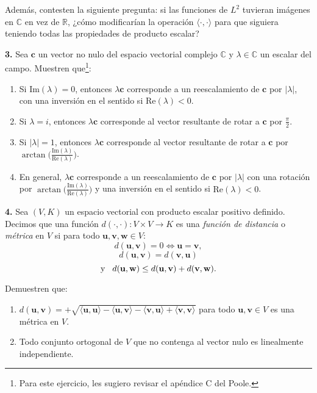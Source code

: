 \documentclass[a4paper]{article}
\begin{document}
Además, contesten la siguiente pregunta: si las funciones de $L^2$ tuvieran imágenes en $\mathbb{C}$ en vez de $\mathbb{R}$, ¿cómo modificarían la operación $\langle\cdot, \cdot\rangle$ para que siguiera teniendo todas las propiedades de producto escalar?

\newpage
\textbf{3.} Sea $\mathbf{c}$ un vector no nulo del espacio vectorial complejo $\mathbb{C}$ y $\lambda\in\mathbb{C}$ un escalar del campo. Muestren que\footnote{Para este ejercicio, les sugiero revisar el apéndice C del Poole.}:
\begin{enumerate}[label=\alph*)]
    \item Si $\text{Im}(\lambda)=0$, entonces $\lambda\mathbf{c}$ corresponde a un reescalamiento de $\mathbf{c}$ por $|\lambda|$, con una inversión en el sentido si $\text{Re}(\lambda)<0$.
    \item Si $\lambda=i$, entonces $\lambda\mathbf{c}$ corresponde al vector resultante de rotar a $\mathbf{c}$ por $\frac{\pi}{2}.$
    \item Si $|\lambda|=1$, entonces $\lambda\mathbf{c}$ corresponde al vector resultante de rotar a $\mathbf{c}$ por $\arctan\big(\frac{\text{Im}(\lambda)}{\text{Re}(\lambda)}\big)$.
    \item En general, $\lambda\mathbf{c}$ corresponde a un reescalamiento de $\mathbf{c}$ por $|\lambda|$ con una rotación por $\arctan\big(\frac{\text{Im}(\lambda)}{\text{Re}(\lambda)}\big)$ y una inversión en el sentido si $\text{Re}(\lambda)<0$.
\end{enumerate}

\vspace{1cm}
\textbf{4.} Sea $(V,K)$ un espacio vectorial con producto escalar positivo definido. Decimos que una función $d(\cdot,\cdot):V\times V\to K$ es una \emph{función de distancia} o \emph{métrica} en $V$ si para todo $\mathbf{u},\mathbf{v},\mathbf{w}\in V:$ \[
    d(\mathbf{u},\mathbf{v})=0 \iff \mathbf{u}=\mathbf{v}, \] \[ d(\mathbf{u},\mathbf{v})=d(\mathbf{v},\mathbf{u})
    \] \[\text{y}\hspace{3mm} 
d(\mathbf{u},\mathbf{w})\le d(\mathbf{u},\mathbf{v})+d(\mathbf{v},\mathbf{w})
.\]

\vspace{3mm}
\noindent Demuestren que:
\begin{enumerate}[label=\alph*)]
    \item $d(\mathbf{u},\mathbf{v})=+\sqrt{\langle \mathbf{u},\mathbf{u}\rangle-\langle\mathbf{u},\mathbf{v}\rangle-\langle\mathbf{v},\mathbf{u}\rangle+\langle\mathbf{v},\mathbf{v}\rangle}$ para todo $\mathbf{u},\mathbf{v}\in V$ es una métrica en $V$.
    \item Todo conjunto ortogonal de $V$ que no contenga al vector nulo es linealmente independiente.
\end{enumerate}
\end{document}

